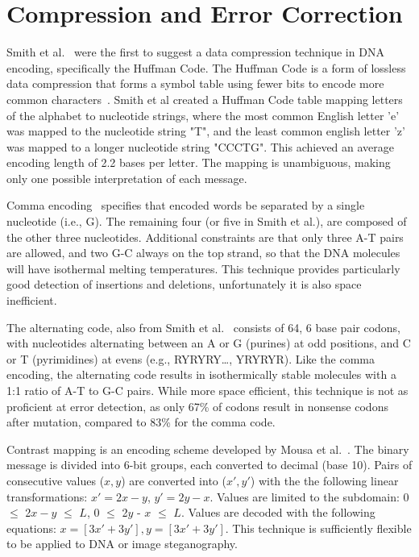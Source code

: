 \documentclass{bioinfo}
\begin{document}
\section{Compression and Error Correction}

Smith et al.~\cite{SFHC2003BL} were the first to suggest a data compression technique in DNA encoding, specifically the Huffman Code. The Huffman Code is a form of lossless data compression that forms a symbol table using fewer bits to encode more common characters~\cite{H1952POTIRE}. Smith et al created a Huffman Code table mapping letters of the alphabet to nucleotide strings, where the most common English letter 'e' was mapped to the nucleotide string "T", and the least common english letter 'z' was mapped to a longer nucleotide string "CCCTG". This achieved an average encoding length of 2.2 bases per letter. The mapping is unambiguous, making only one possible interpretation of each message.

Comma encoding~\cite{BVSPNAS2000} specifies that encoded words be separated by a single nucleotide (i.e., G). The remaining four (or five in Smith et al.), are composed of the other three nucleotides. Additional constraints are that only three A-T pairs are allowed, and two G-C always on the top strand, so that the DNA molecules will have isothermal melting temperatures. This technique provides particularly good detection of insertions and deletions, unfortunately it is also space inefficient.

The alternating code, also from Smith et al.~\cite{SFHC2003BL} consists of 64, 6 base pair codons, with nucleotides alternating between an A or G (purines) at odd positions, and C or T (pyrimidines) at evens (e.g., RYRYRY…, YRYRYR). Like the comma encoding, the alternating code results in isothermically stable molecules with a 1:1 ratio of A-T to G-C pairs. While more space efficient, this technique is not as proficient at error detection, as only 67\% of codons result in nonsense codons after mutation, compared to 83\% for the comma code.

Contrast mapping is an encoding scheme developed by Mousa et al.~\cite{MMAIAJI2011}. The binary message is divided into 6-bit groups, each converted to decimal (base 10). Pairs of consecutive values ($x, y$) are converted into ($x', y'$) with the the following linear transformations: $x' = 2x - y$,  $y' = 2y - x$. Values are limited to the subdomain:  0 $\leq$ 2$x - y$ $\leq$ $L$, 0 $\leq$ 2$y$ - $x$ $\leq$ $L$. Values are decoded with the following equations: $x = [3x' + 3y'], y = [3 x' + 3y']$. This technique is sufficiently flexible to be applied to DNA or image steganography.
\end{document}
